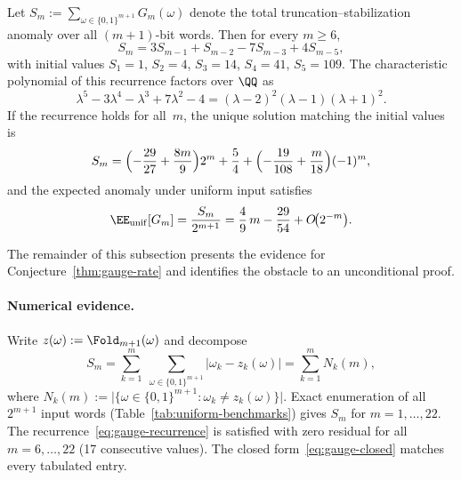 \begin{conjecture}\label{thm:gauge-rate}
Let $S_m:=\sum_{\omega\in\{0,1\}^{m+1}}G_m(\omega)$ denote the total truncation--stabilization anomaly over all $(m{+}1)$-bit words. Then for every $m\ge 6$,
\begin{equation}\label{eq:gauge-recurrence}
S_m = 3S_{m-1}+S_{m-2}-7S_{m-3}+4S_{m-5},
\end{equation}
with initial values $S_1=1$, $S_2=4$, $S_3=14$, $S_4=41$, $S_5=109$. The characteristic polynomial of this recurrence factors over $\QQ$ as
\begin{equation}\label{eq:gauge-charpoly}
\lambda^5-3\lambda^4-\lambda^3+7\lambda^2-4
=
(\lambda-2)^2(\lambda-1)(\lambda+1)^2.
\end{equation}
If the recurrence holds for all~$m$, the unique solution matching the initial values is
\begin{equation}\label{eq:gauge-closed}
S_m
=
\Bigl(-\frac{29}{27}+\frac{8m}{9}\Bigr)2^m
+\frac{5}{4}
+\Bigl(-\frac{19}{108}+\frac{m}{18}\Bigr)(-1)^m,
\end{equation}
and the expected anomaly under uniform input satisfies
\begin{equation}\label{eq:gauge-slope}
\EE_{\mathrm{unif}}[G_m]
=
\frac{S_m}{2^{m+1}}
=
\frac{4}{9}\,m
-\frac{29}{54}
+O\!\bigl(2^{-m}\bigr).
\end{equation}
\end{conjecture}

The remainder of this subsection presents the evidence for Conjecture~\ref{thm:gauge-rate} and identifies the obstacle to an unconditional proof.

\paragraph{Numerical evidence.}
Write $z(\omega):=\Fold_{m+1}(\omega)$ and decompose
\[
S_m
=
\sum_{k=1}^{m}\;\sum_{\omega\in\{0,1\}^{m+1}}
\bigl|\omega_k-z_k(\omega)\bigr|
=
\sum_{k=1}^{m} N_k(m),
\]
where $N_k(m):=\bigl|\bigl\{\omega\in\{0,1\}^{m+1}:\omega_k\neq z_k(\omega)\bigr\}\bigr|$. Exact enumeration of all $2^{m+1}$ input words (Table~\ref{tab:uniform-benchmarks}) gives $S_m$ for $m=1,\ldots,22$. The recurrence~\eqref{eq:gauge-recurrence} is satisfied with zero residual for all $m=6,\ldots,22$ (17 consecutive values). The closed form~\eqref{eq:gauge-closed} matches every tabulated entry.

